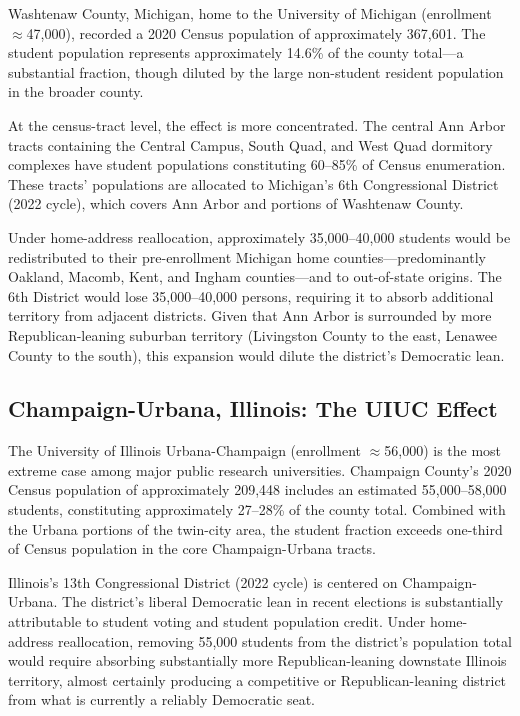 Washtenaw County, Michigan, home to the University of Michigan (enrollment $\approx$47,000), recorded a 2020 Census population of approximately 367,601. The student population represents approximately 14.6\% of the county total---a substantial fraction, though diluted by the large non-student resident population in the broader county.

At the census-tract level, the effect is more concentrated. The central Ann Arbor tracts containing the Central Campus, South Quad, and West Quad dormitory complexes have student populations constituting 60--85\% of Census enumeration. These tracts' populations are allocated to Michigan's 6th Congressional District (2022 cycle), which covers Ann Arbor and portions of Washtenaw County.

Under home-address reallocation, approximately 35,000--40,000 students would be redistributed to their pre-enrollment Michigan home counties---predominantly Oakland, Macomb, Kent, and Ingham counties---and to out-of-state origins. The 6th District would lose 35,000--40,000 persons, requiring it to absorb additional territory from adjacent districts. Given that Ann Arbor is surrounded by more Republican-leaning suburban territory (Livingston County to the east, Lenawee County to the south), this expansion would dilute the district's Democratic lean.

\subsection{Champaign-Urbana, Illinois: The UIUC Effect}

The University of Illinois Urbana-Champaign (enrollment $\approx$56,000) is the most extreme case among major public research universities. Champaign County's 2020 Census population of approximately 209,448 includes an estimated 55,000--58,000 students, constituting approximately 27--28\% of the county total. Combined with the Urbana portions of the twin-city area, the student fraction exceeds one-third of Census population in the core Champaign-Urbana tracts.

Illinois's 13th Congressional District (2022 cycle) is centered on Champaign-Urbana. The district's liberal Democratic lean in recent elections is substantially attributable to student voting and student population credit. Under home-address reallocation, removing 55,000 students from the district's population total would require absorbing substantially more Republican-leaning downstate Illinois territory, almost certainly producing a competitive or Republican-leaning district from what is currently a reliably Democratic seat.

